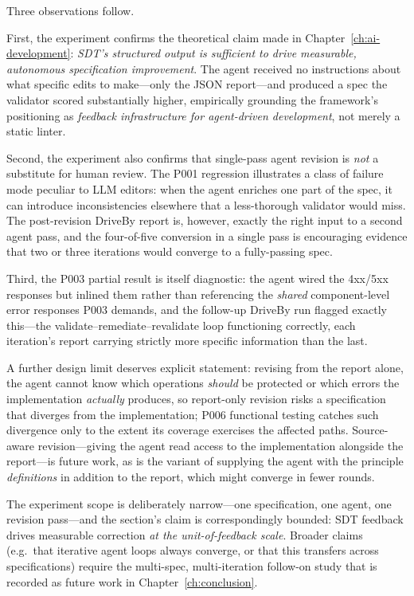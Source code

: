 Three observations follow.

First, the experiment confirms the theoretical claim made in Chapter~\ref{ch:ai-development}: \emph{SDT's structured output is sufficient to drive measurable, autonomous specification improvement}. The agent received no instructions about what specific edits to make---only the JSON report---and produced a spec the validator scored substantially higher, empirically grounding the framework's positioning as \emph{feedback infrastructure for agent-driven development}, not merely a static linter.

Second, the experiment also confirms that single-pass agent revision is \emph{not} a substitute for human review. The P001 regression illustrates a class of failure mode peculiar to LLM editors: when the agent enriches one part of the spec, it can introduce inconsistencies elsewhere that a less-thorough validator would miss. The post-revision DriveBy report is, however, exactly the right input to a second agent pass, and the four-of-five conversion in a single pass is encouraging evidence that two or three iterations would converge to a fully-passing spec.

Third, the P003 partial result is itself diagnostic: the agent wired the 4xx/5xx responses but inlined them rather than referencing the \emph{shared} component-level error responses P003 demands, and the follow-up DriveBy run flagged exactly this---the validate--remediate--revalidate loop functioning correctly, each iteration's report carrying strictly more specific information than the last.

A further design limit deserves explicit statement: revising from the report alone, the agent cannot know which operations \emph{should} be protected or which errors the implementation \emph{actually} produces, so report-only revision risks a specification that diverges from the implementation; P006 functional testing catches such divergence only to the extent its coverage exercises the affected paths. Source-aware revision---giving the agent read access to the implementation alongside the report---is future work, as is the variant of supplying the agent with the principle \emph{definitions} in addition to the report, which might converge in fewer rounds.

The experiment scope is deliberately narrow---one specification, one agent, one revision pass---and the section's claim is correspondingly bounded: SDT feedback drives measurable correction \emph{at the unit-of-feedback scale}. Broader claims (e.g.\ that iterative agent loops always converge, or that this transfers across specifications) require the multi-spec, multi-iteration follow-on study that is recorded as future work in Chapter~\ref{ch:conclusion}.

